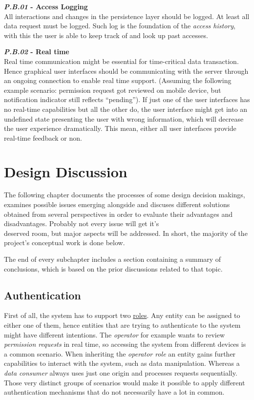 \documentclass[12pt,english,a4paper,titlepage,cleardoublepage=empty,dottedtoc]{report}
\begin{document}
\textbf{\emph{\protect\hypertarget{pb01}{}{P.B.01}} - Access Logging}\\
All interactions and changes in the persistence layer should be logged.
At least all data request must be logged. Such log is the foundation of
the \emph{access history}, with this the user is able to keep track of
and look up past accesses.

\textbf{\emph{\protect\hypertarget{pb02}{}{P.B.02}} - Real time}\\
Real time communication might be essential for time-critical data
transaction. Hence graphical user interfaces should be communicating
with the server through an ongoing connection to enable real time
support. (Assuming the following example scenario: permission request
got reviewed on mobile device, but notification indicator still reflects
``pending''). If just one of the user interfaces has no real-time
capabilities but all the other do, the user interface might get into an
undefined state presenting the user with wrong information, which will
decrease the user experience dramatically. This mean, either all user
interfaces provide real-time feedback or non.

\chapter{Design Discussion}\label{design-discussion}

The following chapter documents the processes of some design decision
makings, examines possible issues emerging alongside and discuses
different solutions obtained from several perspectives in order to
evaluate their advantages and disadvantages. Probably not every issue
will get it's\\
deserved room, but major aspects will be addressed. In short, the
majority of the project's conceptual work is done below.

The end of every subchapter includes a section containing a summary of
conclusions, which is based on the prior discussions related to that
topic.

\hypertarget{authentication}{\section{Authentication}\label{authentication}}

First of all, the system has to support two
\protect\hyperlink{sa03}{roles}. Any entity can be assigned to either
one of them, hence entities that are trying to authenticate to the
system might have different intentions. The \emph{operator} for example
wants to review \emph{permission requests} in real time, so accessing
the system from different devices is a common scenario. When inheriting
the \emph{operator role} an entity gains further capabilities to
interact with the system, such as data manipulation. Whereas a
\emph{data consumer} always uses just one origin and processes requests
sequentially. Those very distinct groups of scenarios would make it
possible to apply different authentication mechanisms that do not
necessarily have a lot in common.
\end{document}
